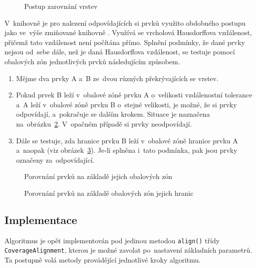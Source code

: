   \begin{figure}[ht]
    \centering
      
      \caption{Postup zarovnání vrstev}
      \label{fig:ca-princip}
  \end{figure}

V~knihovně  je pro nalezení odpovídajících si prvků využito 
obdobného postupu jako ve~výše zmiňované knihovně . Využívá 
se vrcholová Hausdorffova vzdálenost, přičemž tato vzdálenost není počítána 
přímo. Splnění podmínky, že dané prvky nejsou od~sebe dále, než je daná 
Hausdorffova vzdálenost, se testuje pomocí obalových zón jednotlivých prvků 
následujícím způsobem.

\begin{enumerate}
 \item Mějme dva prvky A a~B ze~dvou různých překrývajících se vrstev.
 \item Pokud prvek B leží v~obalové zóně prvku A o~velikosti vzdálenostní 
    tolerance a~A leží v~obalové zóně prvku B o~stejné velikosti, je možné, 
    že si prvky odpovídají, a~pokračuje se dalším krokem. Situace je naznačena
    na~obrázku~\ref{fig:buffer}. V~opačném případě si prvky neodpovídají.
 \item Dále se testuje, zda hranice prvku B leží v~obalové zóně hranice prvku
    A a~naopak (viz obrázek~\ref{fig:buffer-boundary}). Je-li splněna i~tato 
    podmínka, pak jsou prvky označeny za~odpovídající.
\end{enumerate}

  \begin{figure}[H]
    \centering
      \small
      \def\svgwidth{380pt}
      
      \caption{Porovnání prvků na základě jejich obalových zón}
      \label{fig:buffer}
  \end{figure}

  \begin{figure}[H]
    \centering
      \small
      \def\svgwidth{390pt}
      
      \caption{Porovnání prvků na základě obalových zón jejich hranic}
      \label{fig:buffer-boundary}
  \end{figure}

\subsection{Implementace}
\label{ca-implementace}
Algoritmus je opět implementován pod jedinou metodou \texttt{align()} 
třídy \texttt{Coverage\-Align\-ment}, kterou je možné zavolat po~nastavení
základních parametrů. Ta po\-stupně volá metody provádějící jednotlivé
kroky algoritmu.

